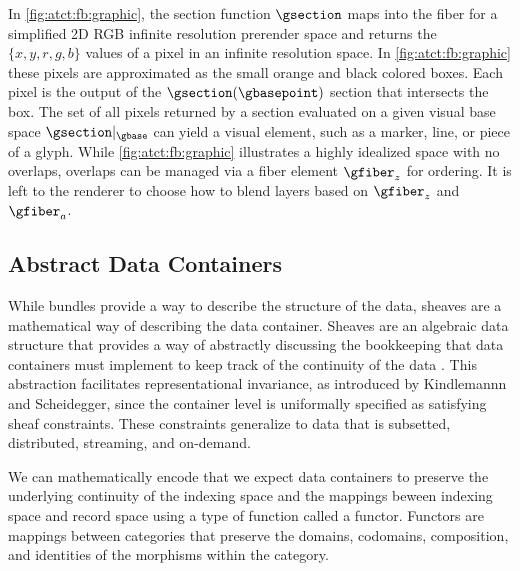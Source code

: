 \documentclass[10pt,journal,compsoc]{IEEEtran}
\theoremstyle{definition}
\theoremstyle{remark}
\begin{document}
In \autoref{fig:atct:fb:graphic}, the section function $\gsection$ maps into the fiber for a simplified 2D RGB infinite resolution prerender space and returns the $\{x,y,r,g,b\}$ values of a pixel in an infinite resolution space. In \autoref{fig:atct:fb:graphic} these pixels are approximated as the small orange and black colored boxes. Each pixel is the output of the $\gsection(\gbasepoint)$ section that intersects the box. The set of all pixels returned by a section evaluated on a given visual base space $\gsection|_{\gbase}$ can yield a visual element, such as a marker, line, or piece of a glyph. While \autoref{fig:atct:fb:graphic} illustrates a highly idealized space with no overlaps, overlaps can be managed via a fiber element $\gfiber_{z}$ for ordering. It is left to the renderer to choose how to blend layers based on $\gfiber_{z}$ and $\gfiber_{a}$. 

\subsection{Abstract Data Containers}
\label{sec:atct:sheaves}
While bundles provide a way to describe the structure of the data, sheaves are a mathematical way of describing the data container. Sheaves are an algebraic data structure that provides a way of abstractly discussing the bookkeeping that data containers must implement to keep track of the continuity of the data \cite{ghristElementaryAppliedTopology2014}. This abstraction facilitates representational invariance, as introduced by Kindlemannn and Scheidegger\cite{kindlmannAlgebraicProcessVisualization2014}, since the container level is uniformally specified as satisfying sheaf constraints. These constraints generalize to data that is subsetted, distributed, streaming, and on-demand. 


We can mathematically encode that we expect data containers to preserve the underlying continuity of the indexing space and the mappings beween indexing space and record space using a type of function called a functor. Functors are mappings between categories that preserve the domains, codomains, composition, and identities of the morphisms within the category\cite{riehlCategoryTheoryContext}.
\end{document}

